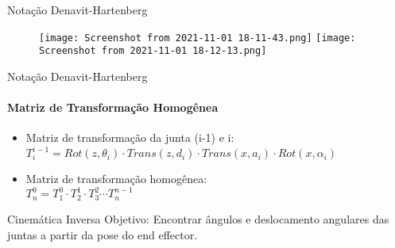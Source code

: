 \begin{frame}[c]{Notação Denavit-Hartenberg} 
    \large
    
    \begin{figure}
        \texttt{[image: Screenshot from 2021-11-01 18-11-43.png]}
        \texttt{[image: Screenshot from 2021-11-01 18-12-13.png]}
    \end{figure}
\end{frame}
\begin{frame}[c]{Notação Denavit-Hartenberg} 
    \framesubtitle{Matriz de Transformação Homogênea}
    \large{
    \begin{itemize}
        \item Matriz de transformação da junta (i-1) e i:\\
        \vspace{0.3cm}
        $T_{i}^{i-1}=Rot(z,\theta_{i})\cdot Trans(z,d_{i})\cdot Trans(x,a_{i})\cdot Rot(x,\alpha_{i})$\\
    \end{itemize}
    
    \begin{itemize}
        \item Matriz de transformação homogênea:\\
        \vspace{0.3cm}
        $T_{n}^{0}=T_{1}^{0}\cdot T_{2}^{1} \cdot T_{3}^{2} \cdots T_{n}^{n-1}$
    \end{itemize}
    }
\end{frame}
\begin{frame}[c]{Cinemática Inversa} 
    Objetivo: Encontrar ângulos e deslocamento angulares das juntas a partir da pose do end effector.
\end{frame}
